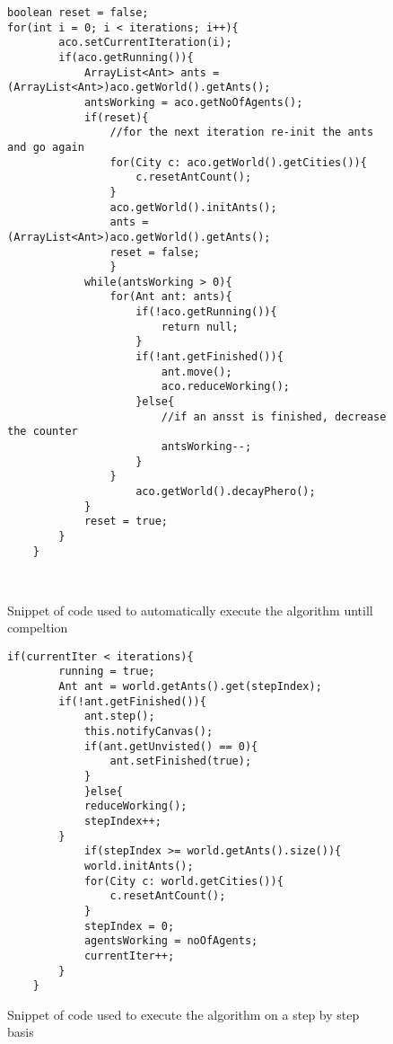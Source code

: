 \begin{figure}[H]
\begin{lstlisting}
boolean reset = false;
for(int i = 0; i < iterations; i++){
		aco.setCurrentIteration(i);
		if(aco.getRunning()){
			ArrayList<Ant> ants = (ArrayList<Ant>)aco.getWorld().getAnts();
			antsWorking = aco.getNoOfAgents();
			if(reset){
				//for the next iteration re-init the ants and go again
				for(City c: aco.getWorld().getCities()){
					c.resetAntCount();
				}
				aco.getWorld().initAnts();
				ants = (ArrayList<Ant>)aco.getWorld().getAnts();
				reset = false;
				}
			while(antsWorking > 0){
				for(Ant ant: ants){
					if(!aco.getRunning()){
						return null;
					}
					if(!ant.getFinished()){
						ant.move();	
						aco.reduceWorking();
					}else{
						//if an ansst is finished, decrease the counter
						antsWorking--;
					}
				}
					aco.getWorld().decayPhero();
			}
			reset = true;
		}
	}
	
	
\end{lstlisting}
\caption{Snippet of code used to automatically execute the algorithm untill compeltion}
\label{iterationThing}
\end{figure}

\begin{figure}[H]
\begin{lstlisting}
if(currentIter < iterations){
		running = true;
		Ant ant = world.getAnts().get(stepIndex);
		if(!ant.getFinished()){
			ant.step();
			this.notifyCanvas();
			if(ant.getUnvisted() == 0){
				ant.setFinished(true);
			}
			}else{
			reduceWorking();
			stepIndex++;
		}
			if(stepIndex >= world.getAnts().size()){
			world.initAnts();
			for(City c: world.getCities()){
				c.resetAntCount();
			}
			stepIndex = 0;
			agentsWorking = noOfAgents;
			currentIter++;
		}
	}
\end{lstlisting}
\caption{Snippet of code used to execute the algorithm on a step by step basis}
\label{stepM8}
\end{figure}

